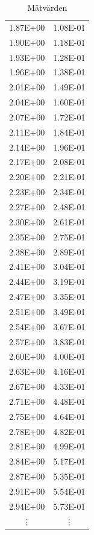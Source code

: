 \documentclass[11p, titlepage, oneside, a4paper]{article}
\begin{document}
\begin{table}
\begin{center}
\begin{tabular}{ |c|c| }
                1.87E+00 & 1.08E-01 \\
                1.90E+00 & 1.18E-01 \\
                1.93E+00 & 1.28E-01 \\
                1.96E+00 & 1.38E-01 \\
                2.01E+00 & 1.49E-01 \\
                2.04E+00 & 1.60E-01 \\
                2.07E+00 & 1.72E-01 \\
                2.11E+00 & 1.84E-01 \\
                2.14E+00 & 1.96E-01 \\
                2.17E+00 & 2.08E-01 \\
                2.20E+00 & 2.21E-01 \\
                2.23E+00 & 2.34E-01 \\
                2.27E+00 & 2.48E-01 \\
                2.30E+00 & 2.61E-01 \\
                2.35E+00 & 2.75E-01 \\
                2.38E+00 & 2.89E-01 \\
                2.41E+00 & 3.04E-01 \\
                2.44E+00 & 3.19E-01 \\
                2.47E+00 & 3.35E-01 \\
                2.51E+00 & 3.49E-01 \\
                2.54E+00 & 3.67E-01 \\
                2.57E+00 & 3.83E-01 \\
                2.60E+00 & 4.00E-01 \\
                2.63E+00 & 4.16E-01 \\
                2.67E+00 & 4.33E-01 \\
                2.71E+00 & 4.48E-01 \\
                2.75E+00 & 4.64E-01 \\
                2.78E+00 & 4.82E-01 \\
                2.81E+00 & 4.99E-01 \\
                2.84E+00 & 5.17E-01 \\
                2.87E+00 & 5.35E-01 \\
                2.91E+00 & 5.54E-01 \\
                2.94E+00 & 5.73E-01 \\
            \vdots & \vdots \\
            \hline
            \end{tabular}
            \caption{Mätvärden}
            \label{table:result}
            \end{center}
        \end{table}

    
    \printbibliography
\end{document}
